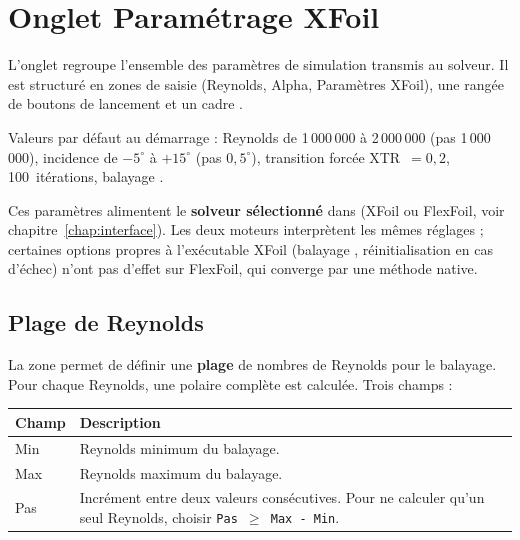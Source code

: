\chapter{Onglet Paramétrage XFoil}
\label{chap:xfoil}

L'onglet  regroupe l'ensemble des paramètres
de simulation transmis au solveur. Il est structuré en zones de
saisie (Reynolds, Alpha, Paramètres XFoil), une rangée de boutons
de lancement et un cadre .


\begin{noteinfo}
Valeurs par défaut au démarrage : Reynolds de 1\,000\,000 à
2\,000\,000 (pas 1\,000\,000), incidence de $-5^\circ$ à $+15^\circ$
(pas $0{,}5^\circ$), transition forcée XTR~$=0{,}2$, 100~itérations,
balayage .
\end{noteinfo}

\begin{noteinfo}
Ces paramètres alimentent le \textbf{solveur sélectionné} dans
 (XFoil ou FlexFoil, voir
chapitre~\ref{chap:interface}). Les deux moteurs interprètent les mêmes
réglages ; certaines options propres à l'exécutable XFoil (balayage
, réinitialisation en cas d'échec) n'ont pas d'effet sur
FlexFoil, qui converge par une méthode native.
\end{noteinfo}

\section{Plage de Reynolds}

La zone  permet de définir une \textbf{plage} de
nombres de Reynolds pour le balayage. Pour chaque Reynolds, une
polaire complète est calculée. Trois champs :

\begin{tabularx}{\linewidth}{l X}
    \toprule
    \textbf{Champ} & \textbf{Description} \\
    \midrule
    Min  & Reynolds minimum du balayage. \\
    Max  & Reynolds maximum du balayage. \\
    Pas  & Incrément entre deux valeurs consécutives. Pour
           ne calculer qu'un seul Reynolds, choisir
           \texttt{Pas $\geq$ Max - Min}. \\
    \bottomrule
\end{tabularx}



